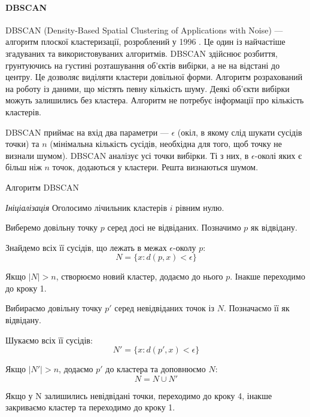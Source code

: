         \paragraph {DBSCAN}
        
            DBSCAN (Density-Based Spatial Clustering of Applications with Noise) --- алгоритм плоскої кластеризації, розроблений у 1996 \cite{DBSCAN}. Це один із найчастіше згадуваних та використовуваних алгоритмів. DBSCAN здійснює розбиття, грунтуючись на густині розташування об'єктів вибірки, а не на відстані до центру. Це дозволяє виділяти кластери довільної форми. Алгоритм розрахований на роботу із даними, що містять певну кількість шуму. Деякі об'єкти вибірки можуть залишились без кластера. Алгоритм не потребує інформації про кількість кластерів.
            
            DBSCAN приймає на вхід два параметри --- $\epsilon$ (окіл, в якому слід шукати сусідів точки) та $n$ (мінімальна кількість сусідів, необхідна для того, щоб точку не визнали шумом). DBSCAN аналізує усі точки вибірки. Ті з них, в $\epsilon$-околі яких є більш ніж $n$ точок, додаються у кластери. Решта визнаються шумом.
            
            \begin{algorithm}
                \caption{Алгоритм DBSCAN}
                \enumerate
                    \item [] \emph{Ініціалізація} Оголосимо лічильник кластерів $i$ рівним нулю.
                    \item Виберемо довільну точку $p$ серед досі не відвіданих. Позначимо $p$ як відвідану.
                    \item Знайдемо всіх її сусідів, що лежать в межах $\epsilon$-околу $p$:
                        \[
                            N = \{x : d(p, x) < \epsilon\}
                        \]
                    \item Якщо $\mid N \mid > n$, створюємо новий кластер, додаємо до нього $p$. Інакше переходимо до кроку 1.
                    \item Вибираємо довільну точку $p'$ серед невідвіданих точок із $N$. Позначаємо її як відвідану.
                    \item Шукаємо всіх її сусідів:
                        \[
                            N' = \{x : d(p', x) < \epsilon\}
                        \]
                    \item Якщо $\mid N' \mid > n$, додаємо $p'$ до кластера та доповнюємо $N$:
                        \[
                            N = N \cup N'
                        \]
                    \item Якщо у N залишились невідвідані точки, переходимо до кроку 4, інакше закриваємо кластер та переходимо до кроку 1.
            \end{algorithm}
            
